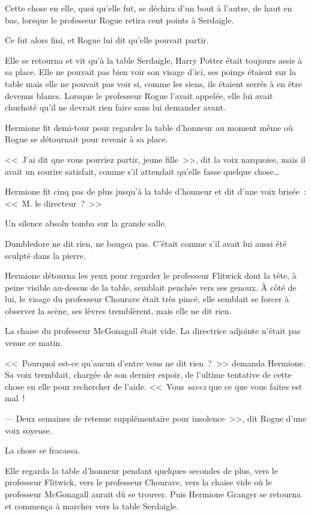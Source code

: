 Cette chose en elle, quoi qu'elle fut, se déchira d'un bout à l'autre, de haut en bas, lorsque le professeur Rogue retira cent points à Serdaigle.

Ce fut alors fini, et Rogue lui dit qu'elle pouvait partir.

Elle se retourna et vit qu'à la table Serdaigle, Harry Potter était toujours assis à sa place. Elle ne pouvait pas bien voir son visage d'ici, ses poings étaient sur la table mais elle ne pouvait pas voir si, comme les siens, ils étaient serrés à en être devenus blancs. Lorsque le professeur Rogue l'avait appelée, elle lui avait chuchoté qu'il ne devrait rien faire sans lui demander avant.

Hermione fit demi-tour pour regarder la table d'honneur au moment même où Rogue se détournait pour revenir à sa place.

<<~J'ai dit que vous pouviez partir, jeune fille~>>, dit la voix narquoise, mais il avait un sourire satisfait, comme s'il attendait qu'elle fasse quelque chose…

Hermione fit cinq pas de plus jusqu'à la table d'honneur et dit d'une voix brisée~: <<~M. le directeur~?~>>

Un silence absolu tomba sur la grande salle.

Dumbledore ne dit rien, ne bougea pas. C'était comme s'il avait lui aussi été sculpté dans la pierre.

Hermione détourna les yeux pour regarder le professeur Flitwick dont la tête, à peine visible au-dessus de la table, semblait penchée vers ses genoux. À côté de lui, le visage du professeur Chourave était très pincé, elle semblait se forcer à observer la scène, ses lèvres tremblèrent, mais elle ne dit rien.

La chaise du professeur McGonagall était vide. La directrice adjointe n'était pas venue ce matin.

<<~Pourquoi est-ce qu'aucun d'entre vous ne dit rien~?~>> demanda Hermione. Sa voix tremblait, chargée de son dernier espoir, de l'ultime tentative de cette chose en elle pour rechercher de l'aide. <<~Vous \emph{savez} que ce que vous faites est mal~!

--- Deux semaines de retenue supplémentaire pour insolence~>>, dit Rogue d'une voix soyeuse.

La chose se fracassa.

Elle regarda la table d'honneur pendant quelques secondes de plus, vers le professeur Flitwick, vers le professeur Chourave, vers la chaise vide où le professeur McGonagall aurait dû se trouver. Puis Hermione Granger se retourna et commença à marcher vers la table Serdaigle.

